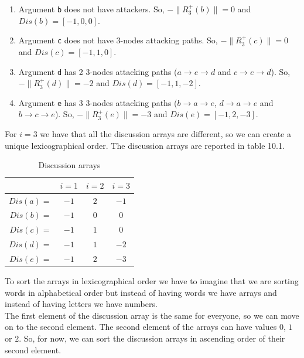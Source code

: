 \documentclass{scrbook}
\begin{document}
\begin{enumerate}
\begin{enumerate}[label=\alph*)]
        \item 
        Argument \texttt{b} does not have attackers. So, $-\|R_3^+(b)\| = 0$ and $Dis(b)=[-1,0,0]$.

        \item 
        Argument \texttt{c} does not have 3-nodes attacking paths. So, $-\|R_3^+(c)\| = 0$ and $Dis(c)=[-1,1,0]$.

        \item 
        Argument \texttt{d} has 2 3-nodes attacking paths ($a \rightarrow e \rightarrow d$ and $c \rightarrow e \rightarrow d$). So, $-\|R_3^+(d)\| = -2$ and $Dis(d)=[-1,1,-2]$.

        \item 
        Argument \texttt{e} has 3 3-nodes attacking paths ($b \rightarrow a \rightarrow e$, $d \rightarrow a \rightarrow e$ and $b \rightarrow c \rightarrow e$). So, $-\|R_3^+(e)\| = -3$ and $Dis(e)=[-1,2,-3]$.
    \end{enumerate}

    For $i=3$ we have that all the discussion arrays are different, so we can create a unique lexicographical order. The discussion arrays are reported in table 10.1.
\end{enumerate}

\begin{table}[]
    \centering
    \begin{tabular}{|r|c|c|c|} \hline
         &  $i=1$ & $i=2$ & $i=3$ \\ \hline

        $Dis(a)=$ & $-1$ & $2$ & $-1$ \\ \hline
        $Dis(b)=$ & $-1$ & $0$ & $0$ \\ \hline
        $Dis(c)=$ & $-1$ & $1$ & $0$ \\ \hline
        $Dis(d)=$ & $-1$ & $1$ & $-2$ \\ \hline
        $Dis(e)=$ & $-1$ & $2$ & $-3$ \\ \hline
    \end{tabular}
    \caption{Discussion arrays}
\end{table}

To sort the arrays in lexicographical order we have to imagine that we are sorting words in alphabetical order but instead of having words we have arrays and instead of having letters we have numbers. \\

The first element of the discussion array is the same for everyone, so we can move on to the second element. The second element of the arrays can have values $0$, $1$ or $2$. So, for now, we can sort the discussion arrays in ascending order of their second element.
\end{document}
